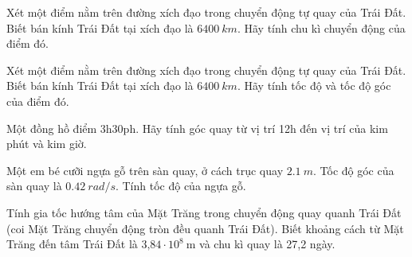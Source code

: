 \begin{ex}
	Xét một điểm nằm trên đường xích đạo trong chuyển động tự quay của Trái Đất. Biết bán kính Trái Đất tại xích đạo là $\SI{6400}{km}.$ Hãy tính chu kì chuyển động của điểm đó.
\end{ex}
\begin{ex}
	Xét một điểm nằm trên đường xích đạo trong chuyển động tự quay của Trái Đất. Biết bán kính Trái Đất tại xích đạo là $\SI{6400}{km}.$ Hãy tính tốc độ và tốc độ góc của điểm đó.
\end{ex}
\begin{ex}
Một đồng hồ điểm 3h30ph. Hãy tính góc quay từ vị trí 12h đến vị trí của kim phút và kim giờ.	
\end{ex}
\begin{ex}
	Một em bé cưỡi ngựa gỗ trên sàn quay, ở cách trục quay $\SI{2,1}{m}$. Tốc độ góc của sàn quay là $\SI{0,42}{rad/s}$. Tính tốc độ của ngựa gỗ.	
\end{ex}
\begin{ex}
Tính gia tốc hướng tâm của Mặt Trăng trong chuyển động quay quanh Trái Đất (coi Mặt Trăng chuyển động tròn đều quanh Trái Đất). Biết khoảng cách từ Mặt Trăng đến tâm Trái Đất là $\text{3,84}\cdot 10^8\ \text{m}$ và chu kì quay là 27,2 ngày.	
\end{ex}
